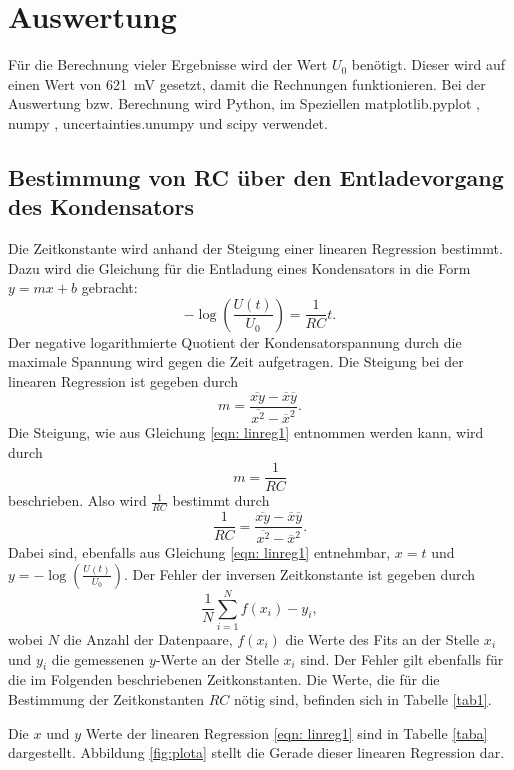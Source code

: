\section{Auswertung}
\label{sec:Auswertung}

Für die Berechnung vieler Ergebnisse wird der Wert $U_0$ benötigt. Dieser wird auf einen Wert von \SI{621}{\milli\volt} gesetzt, damit die Rechnungen funktionieren. %
Bei der Auswertung bzw. Berechnung wird Python, im Speziellen matplotlib.pyplot \cite{matplotlib}, numpy \cite{numpy}, uncertainties.unumpy \cite{uncertainties} und scipy \cite{scipy} verwendet.

\subsection{Bestimmung von RC über den Entladevorgang des Kondensators}
\label{sec: a}
Die Zeitkonstante wird anhand der Steigung einer linearen Regression bestimmt.
Dazu wird die Gleichung für die Entladung eines Kondensators in die Form $y=mx+b$ gebracht:
\begin{equation}
    - \log(\frac{U(t)}{U_{0}}) = \frac{1}{RC} t.
    \label{eqn: linreg1}
\end{equation}
Der negative logarithmierte Quotient der Kondensatorspannung durch die maximale Spannung wird gegen die Zeit aufgetragen.
Die Steigung bei der linearen Regression ist gegeben durch
\begin{equation*}
    m = \frac{\overline{xy} - \overline{x}\overline{y}}{\overline{x^2} - \overline{x}^2}.
\end{equation*}
Die Steigung, wie aus Gleichung \eqref{eqn: linreg1} entnommen werden kann, wird durch
\begin{equation*}
    m = \frac{1}{RC}
\end{equation*}
beschrieben. Also wird $\frac{1}{RC}$ bestimmt durch
\begin{equation}
    \frac{1}{RC}= \frac{\overline{xy} - \overline{x}\overline{y}}{\overline{x^2} - \overline{x}^2}.
    \label{eqn: RC}
\end{equation}
Dabei sind, ebenfalls aus Gleichung \eqref{eqn: linreg1} entnehmbar, $x=t$ und $y=-\log(\frac{U(t)}{U_{0}})$. %
Der Fehler der inversen Zeitkonstante ist gegeben durch
\begin{equation}
    \frac{1}{N} \sum_{i=1}^N f(x_{i}) - y_{i},
    \label{eqn: fehler}
\end{equation}
wobei $N$ die Anzahl der Datenpaare, 
$f(x_{i})$ die Werte des Fits an der Stelle $x_{i}$
und $y_{i}$ die gemessenen $y$-Werte an der Stelle $x_{i}$ sind.
Der Fehler gilt ebenfalls für die im Folgenden beschriebenen Zeitkonstanten.
\newline
Die Werte, die für die Bestimmung der Zeitkonstanten $RC$ nötig sind, befinden sich in Tabelle \ref{tab1}.

Die $x$ und $y$ Werte der linearen Regression \eqref{eqn: linreg1} sind in Tabelle \ref{taba} dargestellt.
Abbildung \ref{fig:plota} stellt die Gerade dieser linearen Regression dar.


